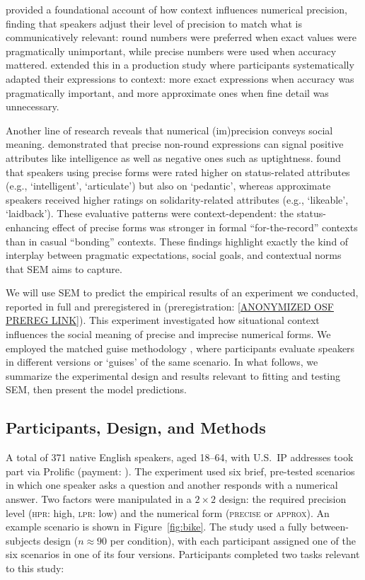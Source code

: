 \documentclass[12pt,a4paper]{article}
\newcommand{\xvar}[1]{\textsc{#1}}
\begin{document}
\citet{vanderhenst2002} provided a foundational account of how context
influences numerical precision, finding that speakers adjust their level of
precision to match what is communicatively relevant: round numbers were preferred
when exact values were pragmatically unimportant, while precise numbers were used
when accuracy mattered. \citet{muehlenberndsolt2022} extended this in a
production study where participants systematically adapted their expressions to
context: more exact expressions when accuracy was pragmatically important, and
more approximate ones when fine detail was unnecessary.

Another line of research reveals that numerical (im)precision conveys social
meaning. \citet{beltrama2018} demonstrated that precise non-round expressions can
signal positive attributes like intelligence as well as negative ones such as
uptightness. \citet{beltramaetal2022} found that speakers using precise forms were
rated higher on status-related attributes (e.g., `intelligent', `articulate') but
also on `pedantic', whereas approximate speakers received higher ratings on
solidarity-related attributes (e.g., `likeable', `laidback'). These evaluative
patterns were context-dependent: the status-enhancing effect of precise forms was
stronger in formal ``for-the-record'' contexts than in casual ``bonding'' contexts.
These findings highlight exactly the kind of interplay between pragmatic
expectations, social goals, and contextual norms that SEM aims to capture.

We will use SEM to predict the empirical results of an experiment we conducted,
reported in full and preregistered in \citet{soltEtAl2025} (preregistration:
\url{[ANONYMIZED OSF PREREG LINK]}). This experiment investigated how
situational context influences the social meaning of
precise and imprecise numerical forms. We employed the matched guise methodology
\citep{campbellkibler2007}, where participants evaluate speakers in different
versions or `guises' of the same scenario. In what follows, we summarize the
experimental design and results relevant to fitting and testing SEM, then present
the model predictions.


\subsection{Participants, Design, and Methods}

A total of 371 native English speakers, aged 18--64, with U.S.~IP addresses took
part via Prolific (payment: ). The experiment used six brief,
pre-tested scenarios in which one speaker asks a question and another responds
with a numerical answer. Two factors were manipulated in a $2 \times 2$ design:
the required precision level (\xvar{hpr}: high, \xvar{lpr}: low) and the
numerical form (\xvar{precise} or \xvar{approx}). An example scenario is shown
in Figure~\ref{fig:bike}. The study used a fully between-subjects design ($n
\approx 90$ per condition), with each participant assigned one of the six
scenarios in one of its four versions. Participants completed two tasks relevant
to this study:
\end{document}
